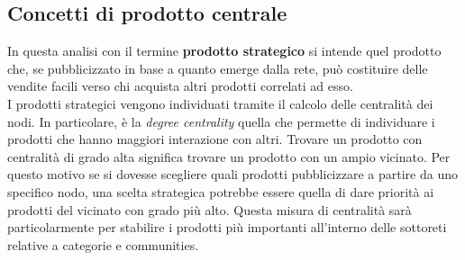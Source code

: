 \subsection{Concetti di prodotto centrale}
In questa analisi con il termine \textbf{prodotto strategico} si intende quel prodotto che, se pubblicizzato in base a quanto emerge dalla rete, può costituire delle vendite facili verso chi acquista altri prodotti correlati ad esso. \\
I prodotti strategici vengono individuati tramite il calcolo delle centralità dei nodi. In particolare, è la \textit{degree centrality} quella che permette di individuare i prodotti che hanno maggiori interazione con altri. Trovare un prodotto con centralità di grado alta significa trovare un prodotto con un ampio vicinato. Per questo motivo se si dovesse scegliere quali prodotti pubblicizzare a partire da uno specifico nodo, una scelta strategica potrebbe essere quella di dare priorità ai prodotti del vicinato con grado più alto. Questa misura di centralità sarà particolarmente per stabilire i prodotti più importanti all'interno delle sottoreti relative a categorie e communities. \\\\
    

